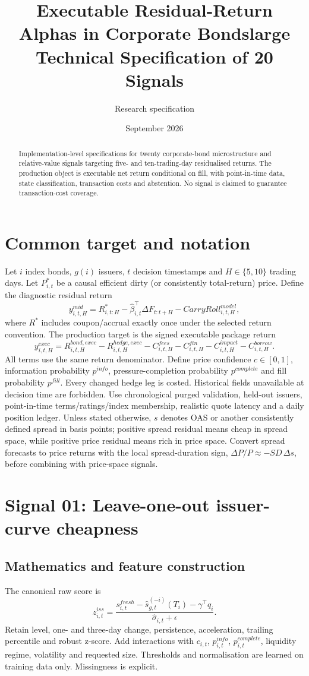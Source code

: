 \documentclass[10pt]{article}
\title{Executable Residual-Return Alphas in Corporate Bondslarge Technical Specification of 20 Signals}\author{Research specification}\date{September 2026}
\begin{document}
\maketitle
\begin{abstract}Implementation-level specifications for twenty corporate-bond microstructure and relative-value signals targeting five- and ten-trading-day residualised returns. The production object is executable net return conditional on fill, with point-in-time data, state classification, transaction costs and abstention. No signal is claimed to guarantee transaction-cost coverage.\end{abstract}\tableofcontents\newpage
\section{Common target and notation}
Let $i$ index bonds, $g(i)$ issuers, $t$ decision timestamps and $H\in\{5,10\}$ trading days. Let $P^*_{i,t}$ be a causal efficient dirty (or consistently total-return) price. Define the diagnostic residual return
\[y^{mid}_{i,t,H}=R^*_{i,t:H}-\widehat\beta_{i,t}^{\top}\Delta F_{t:t+H}-CarryRoll^{model}_{i,t,H},\]
where $R^*$ includes coupon/accrual exactly once under the selected return convention. The production target is the signed executable package return
\[y^{exec}_{i,t,H}=R^{bond,exec}_{i,t,H}-R^{hedge,exec}_{i,t,H}-C^{fees}_{i,t,H}-C^{fin}_{i,t,H}-C^{impact}_{i,t,H}-C^{borrow}_{i,t,H}.\]
All terms use the same return denominator. Define price confidence $c\in[0,1]$, information probability $p^{info}$, pressure-completion probability $p^{complete}$ and fill probability $p^{fill}$. Every changed hedge leg is costed. Historical fields unavailable at decision time are forbidden. Use chronological purged validation, held-out issuers, point-in-time terms/ratings/index membership, realistic quote latency and a daily position ledger. Unless stated otherwise, $s$ denotes OAS or another consistently defined spread in basis points; positive spread residual means cheap in spread space, while positive price residual means rich in price space. Convert spread forecasts to price returns with the local spread-duration sign, $\Delta P/P\approx-SD\,\Delta s$, before combining with price-space signals.\newpage
\section{Signal 01: Leave-one-out issuer-curve cheapness}
\subsection{Mathematics and feature construction}
The canonical raw score is
\begin{equation}z^{iss}_{i,t}=\frac{s^{fresh}_{i,t}-\widehat s^{(-i)}_{g,t}(T_i)-\gamma^\top q_i}{\widehat\sigma_{i,t}+\epsilon}.\end{equation}
Retain level, one- and three-day change, persistence, acceleration, trailing percentile and robust z-score. Add interactions with $c_{i,t}$, $p^{info}_{i,t}$, $p^{complete}_{i,t}$, liquidity regime, volatility and requested size. Thresholds and normalisation are learned on training data only. Missingness is explicit.
\end{document}
